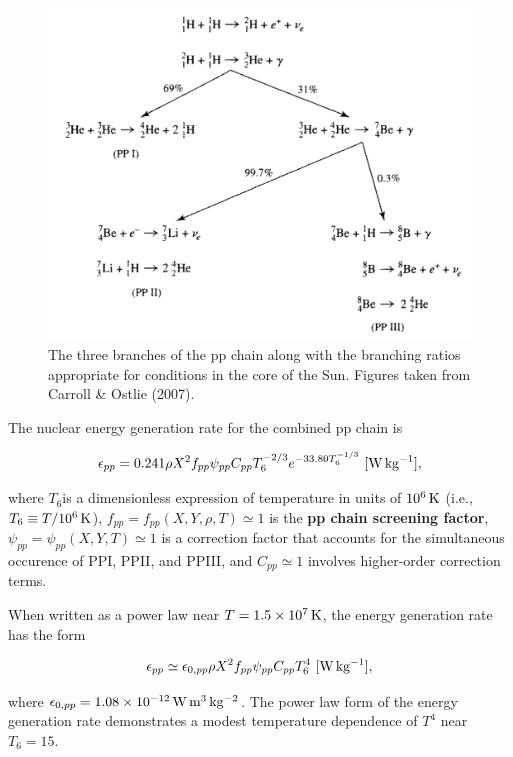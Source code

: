 \documentclass[a4paper,10pt]{article}
\begin{document}
\begin{figure}[t]
    \centering
    \includegraphics[width=12cm]{figures/ppchain.png}
    \caption{\footnotesize{The three branches of the pp chain along with the branching ratios appropriate for conditions in the core of the Sun. Figures taken from Carroll \& Ostlie (2007).}}
    \label{fig:ppchain}
\end{figure}

{\noindent}The nuclear energy generation rate for the combined pp chain is

\begin{align*}
    \epsilon_{pp} = 0.241\rho X^2 f_{pp}\psi_{pp}C_{pp}T_6^{-2/3}e^{-33.80T_6^{-1/3}} ~ [{\rm W\,kg^{-1}}],
\end{align*}

{\noindent}where $T_6$is a dimensionless expression of temperature in units of $10^6\,{\rm K}$ (i.e., $T_6\equiv T/10^6\,{\rm K}$), $f_{pp}=f_{pp}(X,Y,\rho,T)\simeq1$ is the \textbf{pp chain screening factor}, $\psi_{pp}=\psi_{pp}(X,Y,T)\simeq1$ is a correction factor that accounts for the simultaneous occurence of PPI, PPII, and PPIII, and $C_{pp}\simeq1$ involves higher-order correction terms.

{\noindent}When written as a power law near $T=1.5\times10^7\,{\rm K}$, the energy generation rate has the form

\begin{align*}
    \epsilon_{pp} \simeq \epsilon_{0,pp} \rho X^2 f_{pp}\psi_{pp}C_{pp}T_6^4 ~ [{\rm W\,kg^{-1}}],
\end{align*}

{\noindent}where $\epsilon_{0,pp}=1.08\times10^{-12}\,{\rm W\,m^3\,kg^{-2}}$. The power law form of the energy generation rate demonstrates a modest temperature dependence of $T^4$ near $T_6=15$.
\end{document}
